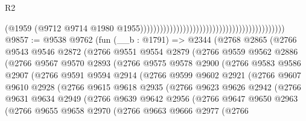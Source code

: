\begin{lexlean}{R2}
\begin{coremodule}
                                                                                        (@1959
                                                                                          (@9712
                                                                                            @9714
                                                                                            @1980
                                                                                            @1955))))))))))))))))))))))))))))))))))))))))))))
@9857 := @9538
    @9762
    (fun (__b : @1791) =>
    @2344
      (@2768
        @2865
        (@2766
          @9543
          @9546
          @2872
          (@2766
            @9551
            @9554
            @2879
            (@2766
              @9559
              @9562
              @2886
              (@2766
                @9567
                @9570
                @2893
                (@2766
                  @9575
                  @9578
                  @2900
                  (@2766
                    @9583
                    @9586
                    @2907
                    (@2766
                      @9591
                      @9594
                      @2914
                      (@2766
                        @9599
                        @9602
                        @2921
                        (@2766
                          @9607
                          @9610
                          @2928
                          (@2766
                            @9615
                            @9618
                            @2935
                            (@2766
                              @9623
                              @9626
                              @2942
                              (@2766
                                @9631
                                @9634
                                @2949
                                (@2766
                                  @9639
                                  @9642
                                  @2956
                                  (@2766
                                    @9647
                                    @9650
                                    @2963
                                    (@2766
                                      @9655
                                      @9658
                                      @2970
                                      (@2766
                                        @9663
                                        @9666
                                        @2977
                                        (@2766

\end{coremodule}
\end{lexlean}
